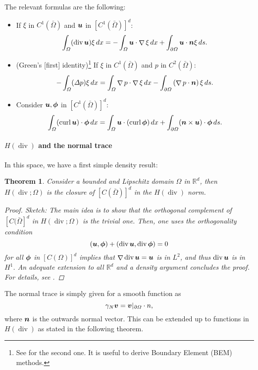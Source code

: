 \documentclass{article}
\renewcommand{\vec}{\vectorsym}
\DeclareMathOperator{\grad}{\nabla}
\DeclareMathOperator{\dive}{\text{div}}
\DeclareMathOperator{\curl}{\text{curl}}
\newcommand{\R}{\mathbb{R}}
\newtheorem{theorem}{Theorem}
\begin{document}
The relevant formulas are the following: 
    \begin{itemize}
        \item If $\xi$ in $C^1(\bar\Omega)$ and $\vec u$ in $[C^1(\bar\Omega)]^d$:
            $$ \int_\Omega (\dive \vec u) \xi\,dx = -\int_\Omega\vec u\cdot \grad \xi\,dx + \int_{\partial\Omega} \vec u \cdot \vec n \xi\,ds.$$
        \item (Green's [first] identity)\footnote{See \cite{monk2003finite} for the second one. It is useful to derive Boundary Element (BEM) methods.} If $\xi$ in $C^1(\bar\Omega)$ and $p$ in $C^2(\bar\Omega)$:
            $$ -\int_\Omega (\Delta p) \xi\,dx = \int_\Omega\grad p\cdot \grad \xi\,dx - \int_{\partial\Omega}\left(\grad p\cdot \vec n\right)\xi\,ds.$$
        \item Consider $\vec u,\vec \phi$ in $[C^1(\bar\Omega)]^d$: 
            $$ \int_\Omega (\curl \vec u) \cdot \vec\phi\,dx = \int_\Omega \vec u \cdot (\curl \vec \phi)\,dx  + \int_{\partial\Omega}(\vec n\times \vec u)\cdot \vec\phi\,ds.$$
    \end{itemize}

\paragraph{$H(\dive)$ and the normal trace} In this space, we have a first simple density result: 

\begin{theorem} Consider a bounded and Lipschitz domain $\Omega$ in $\R^d$, then $H(\dive;\Omega)$ is the closure of $[C(\bar\Omega)]^d$ in the $H(\dive)$ norm.
    \begin{proof}
        Sketch: The main idea is to show that the orthogonal complement of $[C(\bar\Omega]^d$ in $H(\dive;\Omega)$ is the trivial one. Then, one uses the orthogonality condition 
            $$ (\vec u, \vec \phi) + (\dive \vec u, \dive \vec \phi) = 0$$
        for all $\vec\phi$ in $[C(\Omega)]^d$ implies that $\grad \dive\vec u = \vec u$ is in $L^2$, and thus $\dive \vec u$ is in $H^1$. An adequate extension to all $\R^d$ and a density argument concludes the proof. For details, see \cite[Thm 3.22]{monk2003finite}. 
    \end{proof}
\end{theorem}
The normal trace is simply given for a smooth function as 
    $$ \gamma_N \vec v = \vec v|_{\partial\Omega} \cdot n, $$
where $\vec n $ is the outwards normal vector. This can be extended up to functions in $H(\dive)$ as stated in the following theorem. 
\end{document}
